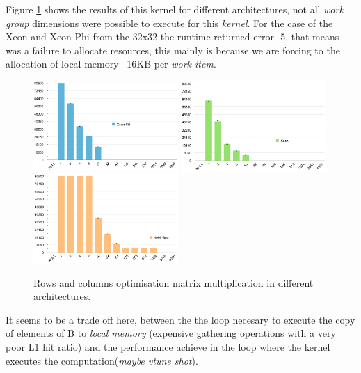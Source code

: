 \par{Figure \ref{RowsCols} shows the results of this kernel for different architectures, not all \emph{work group} dimensions 
    were possible to execute for this \emph{kernel}. For the case of the Xeon and Xeon Phi from the 32x32 the runtime returned
    error -5, that means was a failure to allocate resources\cite{opencl_error}, this mainly is because we are forcing to the 
    allocation of local memory ~16KB per \emph{work item}.

\begin{figure}[!h]
    \centering
    \includegraphics[width=0.49\textwidth]{figures/opt3_phi.png}
    \includegraphics[width=0.49\textwidth]{figures/opt3_cpu.png}
    \includegraphics[width=0.49\textwidth]{figures/opt3_gpu.png}
    \caption{Rows and columns optimisation matrix multiplication in different architectures.}
    \label{RowsCols}
\end{figure}

\par{It seems to be a trade off here, between the the loop necesary to execute the copy of elements of B to \emph{local memory}
    (expensive gathering operations with a very poor L1 hit ratio) and the performance achieve in the loop where the kernel executes
    the computation(\emph{maybe vtune shot}).}

}
